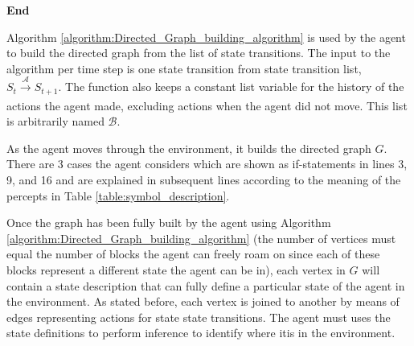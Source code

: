 \begin{algorithm}[H]
{		
	
	}
\Indm 
\textbf{End}   \\
\end{algorithm}
\vspace{0.5cm}

Algorithm \ref{algorithm:Directed_Graph_building_algorithm} is used by the agent to build the directed graph from the list of state transitions. The input to the algorithm per time step is one state transition from state transition list, $S_t \xrightarrow[\text{}]{\mathcal{A}} S_{t+1}$. The function also keeps a constant list variable for the history of the actions the agent made, excluding actions when the agent did not move. This list is arbitrarily named $\mathcal{B}$. 

As the agent moves through the environment, it builds the directed graph $G$. There are 3 cases the agent considers which are shown as if-statements in lines 3, 9, and 16 and are explained in subsequent lines according to the meaning of the percepts in Table \ref{table:symbol_description}. 

Once the graph has been fully built by the agent using Algorithm \ref{algorithm:Directed_Graph_building_algorithm} (the number of vertices must equal the number of blocks the agent can freely roam on since each of these blocks represent a different state the agent can be in), each vertex in $G$ will contain a state description that can fully define a particular state of the agent in the environment. As stated before, each vertex is joined to another by means of edges representing actions for state state transitions. The agent must uses the state definitions to perform inference to identify where itis in the environment.



















\newpage
